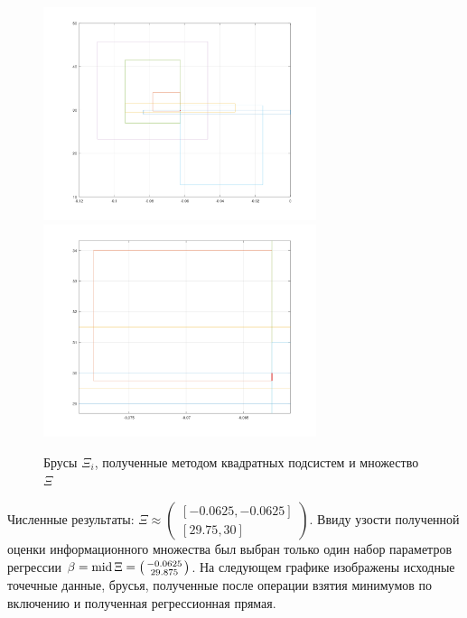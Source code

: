 \documentclass[a4paper]{article}
\begin{document}
\begin{figure}[H]
    \centering
    \includegraphics[width=8cm]{img/boxes.png}
    \includegraphics[width=8cm]{img/boxes_close.png}
    \caption{Брусы $\Xi_i$, полученные методом квадратных подсистем и множество $\Xi$}
    \label{fig:boxes}
\end{figure}
Численные результаты: $\Xi\approx\left(\begin{smallmatrix}[-0.0625,-0.0625]\\ [29.75,30]\end{smallmatrix}\right)$. Ввиду узости полученной оценки информационного множества был выбран только один набор параметров регрессии $\beta=\operatorname{mid}\Xi=\left(\begin{smallmatrix}-0.0625\\ 29.875\end{smallmatrix}\right)$. На следующем графике изображены исходные точечные данные, брусья, полученные после операции взятия минимумов по включению и полученная регрессионная прямая.
\end{document}

